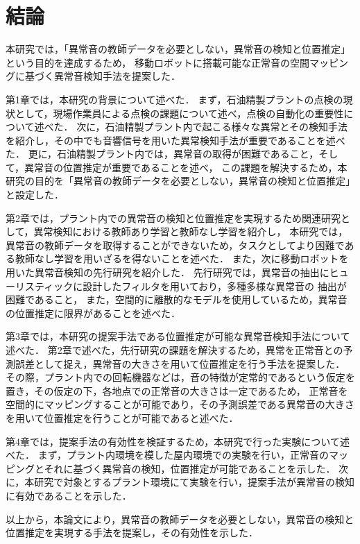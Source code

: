 \documentclass[../main]{subfiles}
\begin{document}
\section{結論}
\label{sec:conc_conclusion}
本研究では，「異常音の教師データを必要としない，異常音の検知と位置推定」という目的を達成するため，
移動ロボットに搭載可能な正常音の空間マッピングに基づく異常音検知手法を提案した．

第1章では，本研究の背景について述べた．
まず，石油精製プラントの点検の現状として，現場作業員による点検の課題について述べ，点検の自動化の重要性について述べた．
次に，石油精製プラント内で起こる様々な異常とその検知手法を紹介し，その中でも音響信号を用いた異常検知手法が重要であることを述べた．
更に，石油精製プラント内では，異常音の取得が困難であること，そして，異常音の位置推定が重要であることを述べ，
この課題を解決するため，本研究の目的を「異常音の教師データを必要としない，異常音の検知と位置推定」と設定した．

第2章では，プラント内での異常音の検知と位置推定を実現するため関連研究として，異常検知における教師あり学習と教師なし学習を紹介し，
本研究では，異常音の教師データを取得することができないため，タスクとしてより困難である教師なし学習を用いざるを得ないことを述べた．
また，次に移動ロボットを用いた異常音検知の先行研究を紹介した．
先行研究では，異常音の抽出にヒューリスティックに設計したフィルタを用いており，多種多様な異常音の
抽出が困難であること，
また，空間的に離散的なモデルを使用しているため，異常音の位置推定に限界があることを述べた．

第3章では，本研究の提案手法である位置推定が可能な異常音検知手法について述べた．
第2章で述べた，先行研究の課題を解決するため，異常を正常音との予測誤差として捉え，異常音の大きさを用いて位置推定を行う手法を提案した．
その際，プラント内での回転機器などは，音の特徴が定常的であるという仮定を置き，その仮定の下，各地点での正常音の大きさは一定であるため，
正常音を空間的にマッピングすることが可能であり，その予測誤差である異常音の大きさを用いて位置推定を行うことが可能であると述べた．

第4章では，提案手法の有効性を検証するため，本研究で行った実験について述べた．
まず，プラント内環境を模した屋内環境での実験を行い，正常音のマッピングとそれに基づく異常音の検知，位置推定が可能であることを示した．
次に，本研究で対象とするプラント環境にて実験を行い，提案手法が異常音の検知に有効であることを示した．

以上から，本論文により，異常音の教師データを必要としない，異常音の検知と位置推定を実現する手法を提案し，その有効性を示した．
\end{document}
